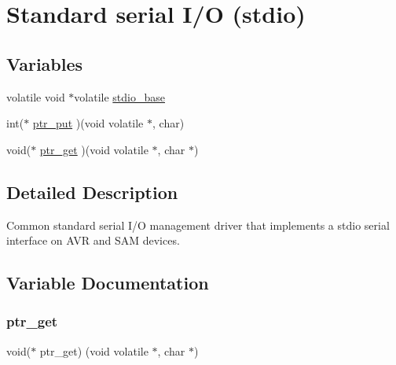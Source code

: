 \hypertarget{group__group__common__utils__stdio__stdio__serial}{}\section{Standard serial I/O (stdio)}
\label{group__group__common__utils__stdio__stdio__serial}
\subsection*{Variables}
\begin{DoxyCompactItemize}
\item 
volatile void $\ast$volatile \mbox{\hyperlink{group__group__common__utils__stdio__stdio__serial_gad4163ee0eaa09db3b42c367fd768e737}{stdio\+\_\+base}}
\item 
int($\ast$ \mbox{\hyperlink{group__group__common__utils__stdio__stdio__serial_gab88750c764f1e24b95134201373aba70}{ptr\+\_\+put}} )(void volatile $\ast$, char)
\item 
void($\ast$ \mbox{\hyperlink{group__group__common__utils__stdio__stdio__serial_ga7332be07af3c0ab09d41a9b0b97efbe8}{ptr\+\_\+get}} )(void volatile $\ast$, char $\ast$)
\end{DoxyCompactItemize}


\subsection{Detailed Description}
Common standard serial I/O management driver that implements a stdio serial interface on A\+VR and S\+AM devices. 

\subsection{Variable Documentation}
\mbox{\label{group__group__common__utils__stdio__stdio__serial_ga7332be07af3c0ab09d41a9b0b97efbe8}} 
\subsubsection{\texorpdfstring{ptr\_get}{ptr\_get}}
{\footnotesize\ttfamily void($\ast$ ptr\+\_\+get) (void volatile $\ast$, char $\ast$)}

